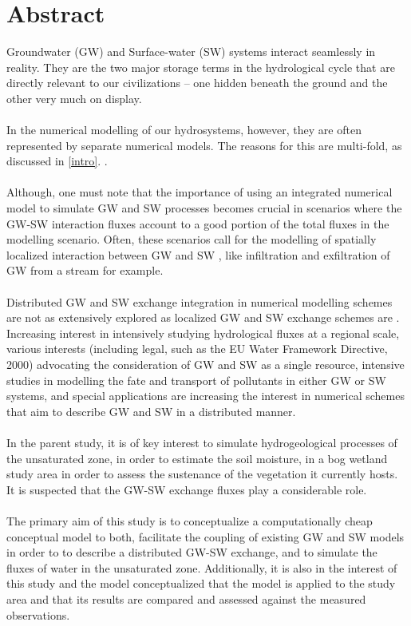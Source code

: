 \chapter*{Abstract}
\thispagestyle{empty}
Groundwater (GW) and Surface-water (SW) systems interact seamlessly in reality. They are the two major storage terms in the hydrological cycle that are directly relevant to our civilizations – one hidden beneath the ground and the other very much on display.
\\ \\
In the numerical modelling of our hydrosystems, however, they are often represented by separate numerical models. The reasons for this are multi-fold, as discussed in \ref{intro}. .
\\ \\
Although, one must note that the importance of using an integrated numerical model to simulate GW and SW processes becomes crucial in scenarios where the GW-SW interaction fluxes account to a good portion of the total fluxes in the modelling scenario. Often, these scenarios call for the modelling of spatially localized interaction between GW and SW \cite{Winter1998}, like infiltration and exfiltration of GW from a stream for example.
\\ \\
Distributed GW and SW exchange integration in numerical modelling schemes are not as extensively explored as localized GW and SW exchange schemes are \cite{Shen2010}. Increasing interest in intensively studying hydrological fluxes at a regional scale, various interests (including legal, such as the EU Water Framework Directive, 2000) advocating the consideration of GW and SW as a single resource, intensive studies in modelling the fate and transport of pollutants in either GW or SW systems, and special applications are increasing the interest \cite{Fleckenstein2010} in numerical schemes that aim to describe GW and SW in a distributed manner.
\\ \\
In the parent study, it is of key interest to simulate hydrogeological processes of the unsaturated zone, in order to estimate the soil moisture, in a bog wetland study area in order to assess the sustenance of the vegetation it currently hosts. It is suspected that the GW-SW exchange fluxes play a considerable role.
\\ \\
The primary aim of this study is to conceptualize a computationally cheap conceptual model to both, facilitate the coupling of existing GW and SW models in order to to describe a distributed GW-SW exchange, and to simulate the fluxes of water in the unsaturated zone. Additionally, it is also in the interest of this study and the model conceptualized that the model is applied to the study area and that its results are compared and assessed against the measured observations.

\endinput